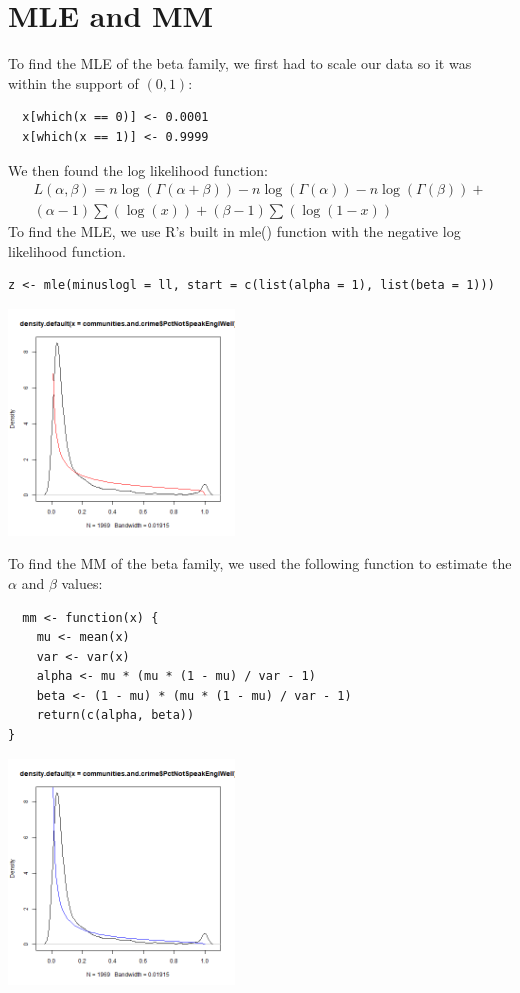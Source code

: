 \documentclass[12pt, letterpaper]{report}
\begin{document}
\section{MLE and MM}
To find the MLE of the beta family, we first had to scale our data so it was within the support of $(0, 1)$: 
\begin{lstlisting}
  x[which(x == 0)] <- 0.0001  
  x[which(x == 1)] <- 0.9999
\end{lstlisting} 
We then found the log likelihood function:
\begin{multline}
L(\alpha, \beta) = n \log{(\Gamma(\alpha+\beta))} - n \log{(\Gamma(\alpha))} - n \log{(\Gamma(\beta))} + \\
(\alpha - 1) \sum(\log(x)) + (\beta-1) \sum(\log{(1-x)})
\end{multline}
To find the MLE, we use R's built in mle() function with the negative log likelihood function. 
\begin{lstlisting}
z <- mle(minuslogl = ll, start = c(list(alpha = 1), list(beta = 1)))
\end{lstlisting} 

\begin{center}
\includegraphics[width=0.45\textwidth]{beta/PctNotSpeakEnglWell_mle}
\end{center}

To find the MM of the beta family, we used the following function to estimate the $\alpha$ and $\beta$ values:
\begin{lstlisting}
  mm <- function(x) {
    mu <- mean(x)
    var <- var(x)
    alpha <- mu * (mu * (1 - mu) / var - 1)
    beta <- (1 - mu) * (mu * (1 - mu) / var - 1)
    return(c(alpha, beta))
}
\end{lstlisting} 

\begin{center}
\includegraphics[width=0.45\textwidth]{beta/PctNotSpeakEnglWell_mm}
\end{center}
\end{document}
